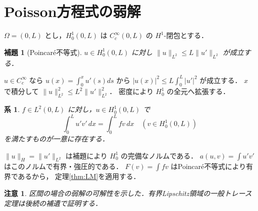 \documentclass[a5paper,10pt,onecolumn]{jsarticle}
\makeatletter
\theoremstyle{mathnotetheorem}
\newtheorem{lemma}[theorem]{補題}
\newtheorem{corollary}[theorem]{系}
\newtheorem{remark}[theorem]{注意}
\renewcommand{\proofname}{証明}
\renewenvironment{proof}[1][\proofname]{%
  \par\pushQED{\qed}\normalfont\topsep4\p@\@plus2\p@\relax
  \trivlist\item[\hskip\labelsep\bfseries #1]\ignorespaces
}{\popQED\endtrivlist\@endpefalse}
\newcommand{\norm}[1]{\lVert #1\rVert}
\makeatother
\begin{document}
\section{Poisson方程式の弱解}
$\Omega=(0,L)$ とし，$H_0^1(0,L)$ は $C_c^\infty(0,L)$ の
$H^1$-閉包とする．
\begin{lemma}[Poincar\'e不等式]
$u\in H_0^1(0,L)$ に対し
$\norm{u}_{L^2}\le L\norm{u'}_{L^2}$ が成立する．
\end{lemma}
\begin{proof}
$u\in C_c^\infty$ なら
$u(x)=\int_0^x u'(s)ds$ から
$|u(x)|^2\le L\int_0^L|u'|^2$ が成立する．
$x$ で積分して $\norm u_{L^2}^2\le L^2\norm{u'}_{L^2}^2$．
密度により $H_0^1$ の全元へ拡張する．
\end{proof}
\begin{corollary}
$f\in L^2(0,L)$ に対し，$u\in H_0^1(0,L)$ で
\[
 \int_0^L u'v'\,dx=\int_0^L fv\,dx
 \quad(v\in H_0^1(0,L))
\]
を満たすものが一意に存在する．
\end{corollary}
\begin{proof}
$\norm u_H=\norm{u'}_{L^2}$ は補題により $H_0^1$ の完備なノルムである．
$a(u,v)=\int u'v'$ はこのノルムで有界・強圧的である．
$F(v)=\int fv$ はPoincar\'e不等式により有界であるから，
定理\ref{thm:LM}を適用する．
\end{proof}
\begin{remark}
区間の場合の弱解の可解性を示した．有界Lipschitz領域の一般トレース定理は後続の補遺で証明する．
\end{remark}
\end{document}
